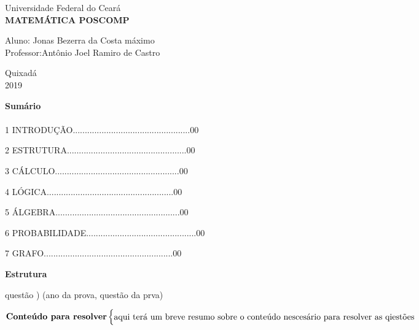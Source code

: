\documentclass{article}
\begin{document}
\begin{titlepage} %
\begin{center} %
    {\large Universidade Federal do Ceará}\\[0.2cm] %
    {\bf \huge MATEMÁTICA POSCOMP}\\[5.1cm] %
\end{center} %
{\large Aluno: Jonas Bezerra da Costa máximo}\\[0.7cm] %
{\large Professor:Antônio Joel Ramiro de Castro}\\[4.2cm]
\begin{center}
    {\large Quixadá}\\[0.2cm]
    {\large 2019}
\end{center}
\end{titlepage}\newpage  %


{\bf \huge Sumário}\\\\

1 INTRODUÇÃO.................................................00

2 ESTRUTURA..................................................00

3 CÁLCULO....................................................00

4 LÓGICA.....................................................00

5 ÁLGEBRA....................................................00

6 PROBABILIDADE..............................................00

7 GRAFO......................................................00\newpage




{\bf \huge Estrutura}\newline




\noindent questão ) (ano da prova, questão da prva)\newline


$

    \noindent \textbf{Conteúdo para resolver}\newline
    \begin{cases}
        \mbox{aqui terá um breve resumo sobre o conteúdo nescesário para resolver as qiestões }     
    \end{cases}
$
\end{document}

